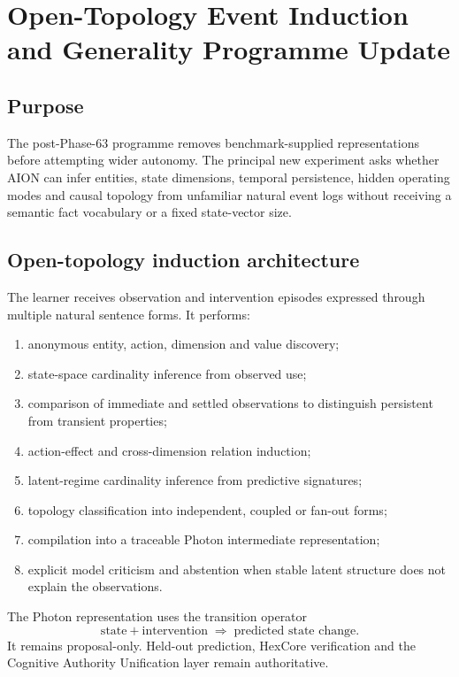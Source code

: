 \section{Open-Topology Event Induction and Generality Programme Update}
\label{sec:open-topology-generality}

\subsection{Purpose}

The post-Phase-63 programme removes benchmark-supplied representations before
attempting wider autonomy.  The principal new experiment asks whether AION can
infer entities, state dimensions, temporal persistence, hidden operating modes
and causal topology from unfamiliar natural event logs without receiving a
semantic fact vocabulary or a fixed state-vector size.

\subsection{Open-topology induction architecture}

The learner receives observation and intervention episodes expressed through
multiple natural sentence forms.  It performs:
\begin{enumerate}
    \item anonymous entity, action, dimension and value discovery;
    \item state-space cardinality inference from observed use;
    \item comparison of immediate and settled observations to distinguish
          persistent from transient properties;
    \item action-effect and cross-dimension relation induction;
    \item latent-regime cardinality inference from predictive signatures;
    \item topology classification into independent, coupled or fan-out forms;
    \item compilation into a traceable Photon intermediate representation;
    \item explicit model criticism and abstention when stable latent structure
          does not explain the observations.
\end{enumerate}

The Photon representation uses the transition operator
\[
    \text{state} + \text{intervention}
    \;\Rightarrow\;
    \text{predicted state change}.
\]
It remains proposal-only.  Held-out prediction, HexCore verification and the
Cognitive Authority Unification layer remain authoritative.

